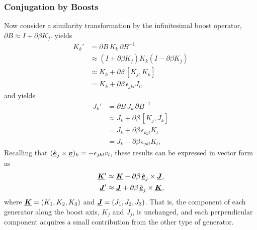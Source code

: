 \subsubsection{Conjugation by Boosts}

Now consider a similarity transformation by the infinitesimal boost operator,
$\partial B \approx I + \partial\beta K_j$.
%
 yields
%
\begin{equation}
\begin{split}
    K_k' &= \partial B \, K_k \, \partial B^{-1} \\
         &\approx (I + \partial\beta K_j) K_k (I - \partial\beta K_j) \\
         &\approx K_k + \partial\beta \, [K_j, K_k] \\
         &= K_k + \partial\beta \, \epsilon_{jkl} J_l,
\end{split}
\end{equation}
%
and  yields
%
\begin{equation}
\begin{split}
    J_k' &= \partial B \, J_k \, \partial B^{-1} \\
         &\approx J_k + \partial\beta \, [K_j, J_k] \\
         &= J_k + \partial\beta \, \epsilon_{kjl} K_l \\
         &= J_k - \partial\beta \, \epsilon_{jkl} K_l,
\end{split}
\end{equation}
%
Recalling that $(\hat{\underline{\mbox{\boldmath $e$}}}_j \times \underline{\mbox{\boldmath $v$}})_k = -\epsilon_{jkl} v_l$, these results can be expressed
in vector form as
\begin{align}
    \underline{\mbox{\boldmath $K$}}' & \approx \underline{\mbox{\boldmath $K$}} - \partial\beta \, \hat{\underline{\mbox{\boldmath $e$}}}_j \times \underline{\mbox{\boldmath $J$}}, \label{eqn:small_boost_K} \\
    \underline{\mbox{\boldmath $J$}}' & \approx \underline{\mbox{\boldmath $J$}} + \partial\beta \, \hat{\underline{\mbox{\boldmath $e$}}}_j \times \underline{\mbox{\boldmath $K$}}, \label{eqn:small_boost_J}
\end{align}
%
where $\underline{\mbox{\boldmath $K$}}=(K_1, K_2, K_3)$ and $\underline{\mbox{\boldmath $J$}}=(J_1, J_2, J_3)$.
%
That is, the component of each generator along the boost axis, $K_j$ and $J_j$, is unchanged,
and each perpendicular component acquires a small contribution from the other type of generator.

